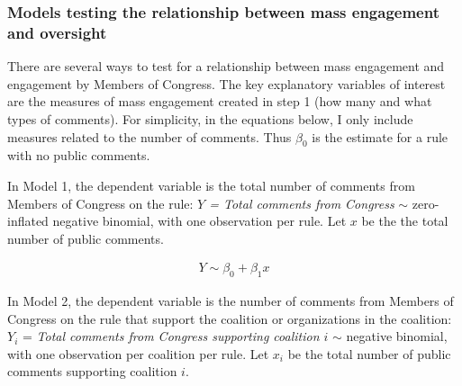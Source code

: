 

\subsubsection{Models testing the relationship between mass engagement and oversight}
There are several ways to test for a relationship between mass engagement and engagement by Members of Congress. The key explanatory variables of interest are the measures of mass engagement created in step 1 (how many and what types of comments). For simplicity, in the equations below, I only include measures related to the number of comments. Thus $\beta_0$ is the estimate for a rule with no public comments.

In Model 1, the dependent variable is the total number of comments from Members of Congress on the rule: \textit{$Y$ = Total comments from Congress} $\sim$ zero-inflated negative binomial, with one observation per rule. Let $x$ be the the total number of public comments. 

\begin{align}
    Y \sim \beta_0 + \beta_1x
\end{align}

In Model 2, the dependent variable is the number of comments from Members of Congress on the rule that support the coalition or organizations in the coalition: $Y_i$ = \textit{Total comments from Congress supporting coalition $i$} $\sim$ negative binomial, with one observation per coalition per rule. Let $x_i$ be the total number of public comments supporting coalition $i$.

